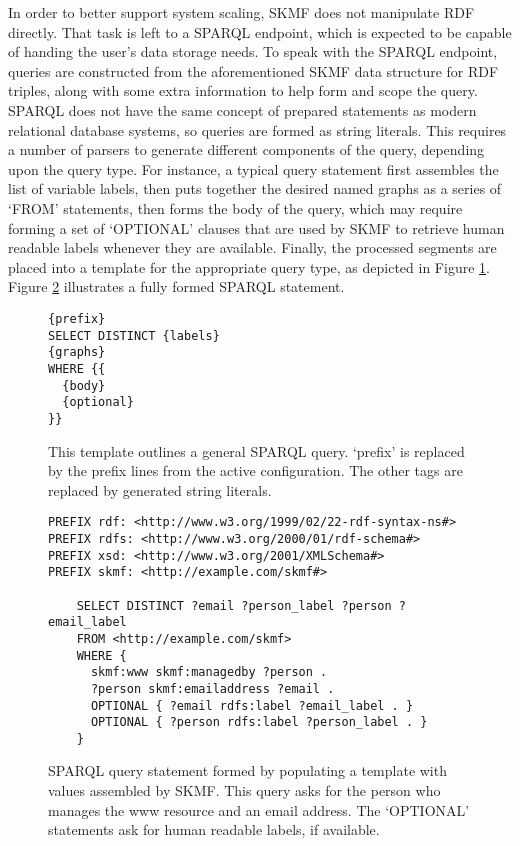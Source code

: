 In order to better support system scaling, SKMF does not manipulate RDF directly. That task is left to a SPARQL endpoint, which is expected to be capable of handing the user's data storage needs. To speak with the SPARQL endpoint, queries are constructed from the aforementioned SKMF data structure for RDF triples, along with some extra information to help form and scope the query. SPARQL does not have the same concept of prepared statements as modern relational database systems, so queries are formed as string literals. This requires a number of parsers to generate different components of the query, depending upon the query type. For instance, a typical query statement first assembles the list of variable labels, then puts together the desired named graphs as a series of `FROM' statements, then forms the body of the query, which may require forming a set of `OPTIONAL' clauses that are used by SKMF to retrieve human readable labels whenever they are available. Finally, the processed segments are placed into a template for the appropriate query type, as depicted in Figure
\ref{sparql-template}.
Figure
\ref{sparql-statement}
illustrates a fully formed SPARQL statement.

\begin{figure}[ht]
\singlespace
\begin{verbatim}
{prefix}
SELECT DISTINCT {labels}
{graphs}
WHERE {{
  {body}
  {optional}
}}
\end{verbatim}
\caption[Template for SPARQL query statements]
 {\narrower This template outlines a general SPARQL query. `prefix' is replaced by the prefix lines from the active configuration. The other tags are replaced by generated string literals.
 }
\label{sparql-template}
\end{figure}

\begin{figure}[!ht]
\singlespace
\begin{verbatim}
PREFIX rdf: <http://www.w3.org/1999/02/22-rdf-syntax-ns#>
PREFIX rdfs: <http://www.w3.org/2000/01/rdf-schema#>
PREFIX xsd: <http://www.w3.org/2001/XMLSchema#>
PREFIX skmf: <http://example.com/skmf#>

    SELECT DISTINCT ?email ?person_label ?person ?email_label
    FROM <http://example.com/skmf>
    WHERE {
      skmf:www skmf:managedby ?person .
      ?person skmf:emailaddress ?email .
      OPTIONAL { ?email rdfs:label ?email_label . }
      OPTIONAL { ?person rdfs:label ?person_label . }
    }
\end{verbatim}
\caption[Generated SPARQL query statement]
 {\narrower SPARQL query statement formed by populating a template with values assembled by SKMF. This query asks for the person who manages the www resource and an email address. The `OPTIONAL' statements ask for human readable labels, if available.
 }
\label{sparql-statement}
\end{figure}


